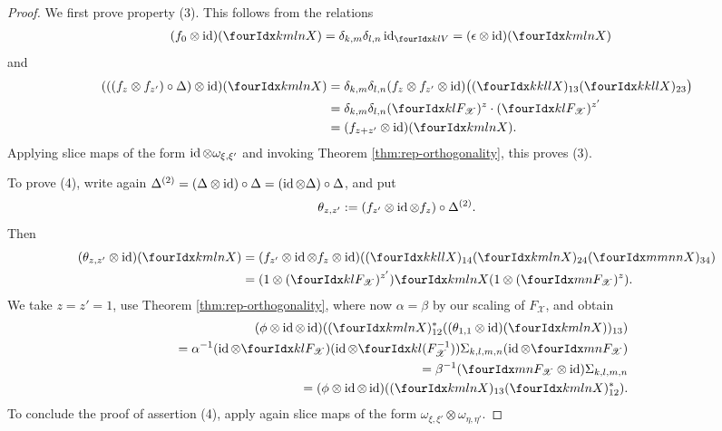 \begin{proof}
    We first prove property (3). This follows from the relations
    \begin{align*}
      (f_{0}  \otimes \id)(\Gr{X}{k}{l}{m}{n}) &=
      \delta_{k,m}\delta_{l,n} \id_{\Gru{V}{k}{l}} =
      (\epsilon \otimes \id)(\Gr{X}{k}{l}{m}{n})
    \end{align*}
    and
    \begin{align*}
      (((f_{z}\otimes f_{z'})\circ \Delta) \otimes
      \id)(\Gr{X}{k}{l}{m}{n}) &=  \delta_{k,m}\delta_{l,n}(f_{z} \otimes f_{z'} \otimes
      \id)\big((\Gr{X}{k}{l}{k}{l})_{13}
      (\Gr{X}{k}{l}{k}{l})_{23}\big) \\
      &=  \delta_{k,m}\delta_{l,n}(\Gru{F_{\mathscr{X}}}{k}{l})^{z}  \cdot (\Gru{F_{\mathscr{X}}}{k}{l})^{z'} \\
      &= (f_{z+z'} \otimes \id)(\Gr{X}{k}{l}{m}{n}).
    \end{align*}
    Applying slice maps of the form $\operatorname{id}
    \otimes \omega_{\xi,\xi'}$ and invoking Theorem \ref{thm:rep-orthogonality}, this proves (3).

    To prove (4), write again $ \Delta^{(2)} = (
    \Delta \otimes \operatorname{id})\circ  \Delta = (\operatorname{id} \otimes 
    \Delta) \circ \Delta$, and put \[\theta_{z,z'}:=(f_{z'} \otimes \operatorname{id}
    \otimes f_{z})\circ  \Delta^{(2)}.\] Then
    \begin{align*}
      (\theta_{z,z'} \otimes \id)(\Gr{X}{k}{l}{m}{n}) &= (f_{z'} \otimes
      \id \otimes f_{z} \otimes
      \id)((\Gr{X}{k}{l}{k}{l})_{14}(\Gr{X}{k}{l}{m}{n})_{24}(\Gr{X}{m}{n}{m}{n})_{34})
      \\
      &= (1 \otimes (\Gru{F_{\mathscr{X}}}{k}{l})^{z'}) \Gr{X}{k}{l}{m}{n} (1
      \otimes (\Gru{F_{\mathscr{X}}}{m}{n})^{z}).
    \end{align*}
    We take $z=z'=1$, use Theorem \ref{thm:rep-orthogonality}, where
    now $\alpha= \beta$ by our scaling of $F_{\mathscr{X}}$, and obtain
    \begin{eqnarray*}
     && \hspace{-2cm} (\phi \otimes \id \otimes
      \id)((\Gr{X}{k}{l}{m}{n})_{12}^{*}((\theta_{1,1} \otimes
      \id)(\Gr{X}{k}{l}{m}{n}))_{13})\\ && =\alpha^{-1}(\id \otimes
      \Gru{F_{\mathscr{X}}}{k}{l}) (\id \otimes \Gru{(F_{\mathscr{X}}^{-1})}{k}{l})
      \Sigma_{k,l,m,n} (\id \otimes
      \Gru{F_{\mathscr{X}}}{m}{n}) \\
      &&=\beta^{-1}(\Gru{F_{\mathscr{X}}}{m}{n} \otimes \id) \Sigma_{k,l,m,n} \\
      &&= (\phi \otimes \id \otimes
      \id)((\Gr{X}{k}{l}{m}{n})_{13}(\Gr{X}{k}{l}{m}{n})_{12}^{*}).
    \end{eqnarray*}
    To conclude the proof of assertion (4), apply again slice maps of the form
    $\omega_{\xi,\xi'} \otimes \omega_{\eta,\eta'}$.


\end{proof}
